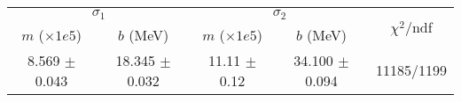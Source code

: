 \begin{tabular}{cc|cc||c}
\multicolumn{2}{c|}{$\sigma_1$} & \multicolumn{2}{|c}{$\sigma_2$} & \multirow{2}{*}{$\chi^2/$ndf} \\
$m$ ($\times1e5$) & $b$ (MeV) & $m$ ($\times1e5$) & $b$ (MeV) & \\
\hline
8.569 $\pm$ 0.043 & 18.345 $\pm$ 0.032 & 11.11 $\pm$ 0.12 & 34.100 $\pm$ 0.094 & 11185/1199\\
\end{tabular}
